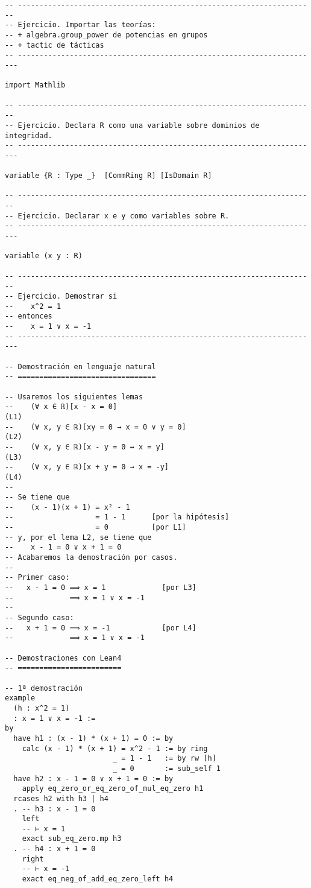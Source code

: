 \begin{verbatim}
-- ---------------------------------------------------------------------
-- Ejercicio. Importar las teorías:
-- + algebra.group_power de potencias en grupos
-- + tactic de tácticas
-- ----------------------------------------------------------------------

import Mathlib

-- ---------------------------------------------------------------------
-- Ejercicio. Declara R como una variable sobre dominios de integridad.
-- ----------------------------------------------------------------------

variable {R : Type _}  [CommRing R] [IsDomain R]

-- ---------------------------------------------------------------------
-- Ejercicio. Declarar x e y como variables sobre R.
-- ----------------------------------------------------------------------

variable (x y : R)

-- ---------------------------------------------------------------------
-- Ejercicio. Demostrar si
--    x^2 = 1
-- entonces
--    x = 1 ∨ x = -1
-- ----------------------------------------------------------------------

-- Demostración en lenguaje natural
-- ================================

-- Usaremos los siguientes lemas
--    (∀ x ∈ ℝ)[x - x = 0]                                           (L1)
--    (∀ x, y ∈ ℝ)[xy = 0 → x = 0 ∨ y = 0]                           (L2)
--    (∀ x, y ∈ ℝ)[x - y = 0 ↔ x = y]                                (L3)
--    (∀ x, y ∈ ℝ)[x + y = 0 → x = -y]                               (L4)
--
-- Se tiene que
--    (x - 1)(x + 1) = x² - 1
--                   = 1 - 1      [por la hipótesis]
--                   = 0          [por L1]
-- y, por el lema L2, se tiene que
--    x - 1 = 0 ∨ x + 1 = 0
-- Acabaremos la demostración por casos.
--
-- Primer caso:
--   x - 1 = 0 ⟹ x = 1             [por L3]
--             ⟹ x = 1 ∨ x = -1
--
-- Segundo caso:
--   x + 1 = 0 ⟹ x = -1            [por L4]
--             ⟹ x = 1 ∨ x = -1

-- Demostraciones con Lean4
-- ========================

-- 1ª demostración
example
  (h : x^2 = 1)
  : x = 1 ∨ x = -1 :=
by
  have h1 : (x - 1) * (x + 1) = 0 := by
    calc (x - 1) * (x + 1) = x^2 - 1 := by ring
                         _ = 1 - 1   := by rw [h]
                         _ = 0       := sub_self 1
  have h2 : x - 1 = 0 ∨ x + 1 = 0 := by
    apply eq_zero_or_eq_zero_of_mul_eq_zero h1
  rcases h2 with h3 | h4
  . -- h3 : x - 1 = 0
    left
    -- ⊢ x = 1
    exact sub_eq_zero.mp h3
  . -- h4 : x + 1 = 0
    right
    -- ⊢ x = -1
    exact eq_neg_of_add_eq_zero_left h4


\end{verbatim}
